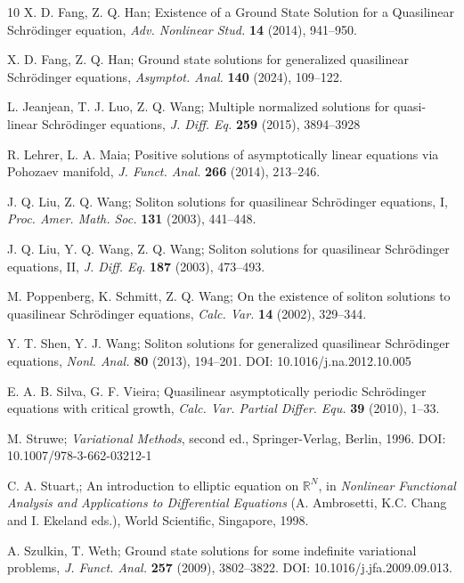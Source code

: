 \documentclass[reqno]{amsart}
\begin{document}
\begin{thebibliography}{10}
 X. D. Fang, Z. Q. Han;
 Existence of a Ground State Solution for a Quasilinear Schr\"odinger equation, 
 \emph{Adv. Nonlinear Stud.} \textbf{14} (2014), 941–950.

 X. D. Fang, Z. Q. Han;
Ground state solutions for generalized quasilinear Schr\"odinger equations, 
\emph{Asymptot. Anal.} \textbf{140} (2024), 109--122.

 L. Jeanjean, T. J. Luo, Z. Q. Wang;
Multiple normalized solutions for quasi-linear Schr\"odinger equations, 
\emph{J. Diff. Eq.} \textbf{259} (2015), 3894–3928

 R. Lehrer, L. A. Maia;
Positive solutions of asymptotically linear equations via Pohozaev manifold, 
\emph{J. Funct. Anal.} \textbf{266}  (2014), 213--246.

 J. Q. Liu, Z. Q. Wang;
Soliton solutions for quasilinear Schr\"odinger equations, I, 
\emph{Proc. Amer. Math. Soc.} \textbf{131} (2003), 441--448.

 J. Q. Liu, Y. Q. Wang, Z. Q. Wang;
Soliton solutions for quasilinear Schr\"odinger equations, II, 
\emph{J. Diff. Eq.} \textbf{187} (2003), 473--493.

 M. Poppenberg, K. Schmitt, Z. Q. Wang;
On the existence of soliton solutions to quasilinear Schr\"odinger equations, 
\emph{Calc. Var.} \textbf{14} (2002), 329--344.

 Y. T. Shen, Y. J. Wang;
Soliton solutions for generalized quasilinear Schr\"odinger equations, 
\emph{Nonl. Anal.} \textbf{80} (2013), 194--201. DOI: 10.1016/j.na.2012.10.005

 E. A. B. Silva, G. F. Vieira;
Quasilinear asymptotically periodic Schr\"odinger equations with critical growth, 
\emph{Calc. Var. Partial Differ. Equ.} \textbf{39} (2010), 1–33.

 M. Struwe;
\emph{Variational Methods}, second ed., Springer-Verlag, Berlin, 1996. DOI: 10.1007/978-3-662-03212-1

 C. A. Stuart,;
An introduction to elliptic equation on ${\mathbb{R}^N}$, in \emph{Nonlinear Functional Analysis and Applications to Differential Equations} (A. Ambrosetti, K.C. Chang and I. Ekeland eds.), 
World Scientific, Singapore, 1998.

 A. Szulkin, T. Weth;
Ground state solutions for some indefinite variational problems, 
\emph{J. Funct. Anal.} \textbf{257}  (2009), 3802--3822. DOI: 10.1016/j.jfa.2009.09.013. 


\end{thebibliography}
\end{document}
